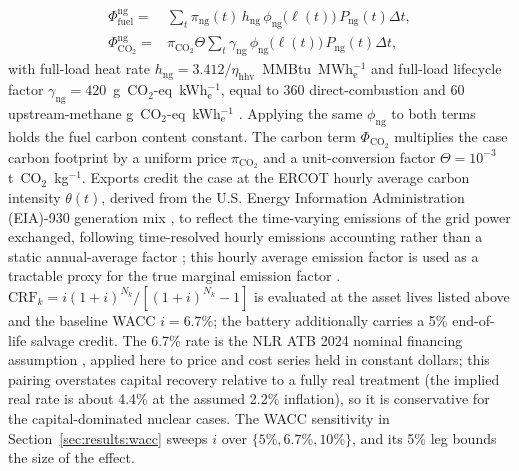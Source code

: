 \documentclass[sn-vancouver,Numbered]{sn-jnl}%
\begin{document}
\begin{align}
\Phi_{\mathrm{fuel}}^{\mathrm{ng}} ={}& \sum_t \pi_{\mathrm{ng}}(t)\,h_{\mathrm{ng}}\,\phi_{\mathrm{ng}}\!\big(\ell(t)\big)\,P_{\mathrm{ng}}(t)\Delta t, \label{eq:ngcc_fuel_cost}\\
\Phi_{\mathrm{CO}_2}^{\mathrm{ng}} ={}&
  \pi_{\mathrm{CO}_2}\Theta \sum_t
  \gamma_{\mathrm{ng}}\,\phi_{\mathrm{ng}}\!\big(\ell(t)\big)\, P_{\mathrm{ng}}(t)\Delta t, \label{eq:ngcc_carbon_cost}
\end{align}
with full-load heat rate $h_{\mathrm{ng}}=3.412/\eta_{\mathrm{hhv}}$~MMBtu~MWh$_\mathrm{e}^{-1}$ and full-load lifecycle factor $\gamma_{\mathrm{ng}}=420$~g~CO$_2$-eq~kWh$_\mathrm{e}^{-1}$, equal to 360 direct-combustion and 60 upstream-methane g~CO$_2$-eq~kWh$_\mathrm{e}^{-1}$ \citep{alvarez2018methane}. Applying the same $\phi_{\mathrm{ng}}$ to both terms holds the fuel carbon content constant. The carbon term $\Phi_{\mathrm{CO}_2}$ multiplies the case carbon footprint by a uniform price $\pi_{\mathrm{CO}_2}$ and a unit-conversion factor $\Theta=10^{-3}$ t~CO$_2$~kg$^{-1}$. Exports credit the case at the ERCOT hourly average carbon intensity $\theta(t)$, derived from the U.S. Energy Information Administration (EIA)-930 generation mix \citep{eia930}, to reflect the time-varying emissions of the grid power exchanged, following time-resolved hourly emissions accounting rather than a static annual-average factor \citep{li2025ghgDemand}; this hourly average emission factor is used as a tractable proxy for the true marginal emission factor \citep{hawkes2010marginal,silerEvans2013regional}. $\mathrm{CRF}_k=i(1+i)^{N_k}/[(1+i)^{N_k}-1]$ is evaluated at the asset lives listed above and the baseline WACC $i=6.7\%$; the battery additionally carries a 5\% end-of-life salvage credit. The 6.7\% rate is the NLR ATB 2024 nominal financing assumption \citep{atb2024nuclear}, applied here to price and cost series held in constant dollars; this pairing overstates capital recovery relative to a fully real treatment (the implied real rate is about 4.4\% at the assumed 2.2\% inflation), so it is conservative for the capital-dominated nuclear cases. The WACC sensitivity in Section~\ref{sec:results:wacc} sweeps $i$ over $\{5\%, 6.7\%, 10\%\}$, and its 5\% leg bounds the size of the effect.
\end{document}
